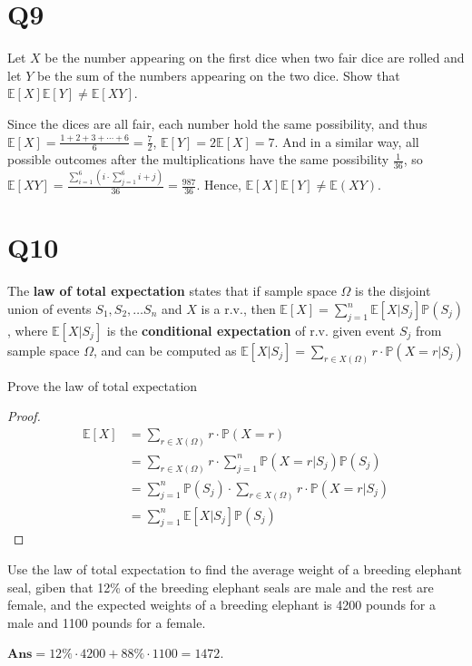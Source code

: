 \documentclass[11pt]{article}
\begin{document}
\section*{Q9}
Let $X$ be the number appearing on the first dice when two fair dice 
are rolled and let $Y$ be the sum of the numbers appearing on 
the two dice. Show that $\mathbb{E}[X]\mathbb{E}[Y]\neq \mathbb{E}[XY]$.
\begin{solution}
    Since the dices are all fair, each number hold the same possibility, and 
    thus $\mathbb{E}[X]=\frac{1+2+3+ \cdots +6}{6}=\frac{7}{2}$, $\mathbb{E}[Y]=2\mathbb{E}[X]=7$.
    And in a similar way, all possible outcomes after the multiplications have the same possibility $\frac{1}{36}$, 
    so $\mathbb{E}[XY]=\frac{\sum_{i=1}^{6}\left( i\cdot \sum_{j=1}^{6}i+j \right)}{36}=\frac{987}{36}$. Hence, $\mathbb{E}[X]\mathbb{E}[Y]\neq \mathbb{E}(XY)$.
\end{solution}

\section*{Q10}
The \textbf{law of total expectation} states that if sample space 
$\Omega$ is the disjoint union of events $S_1,S_2, \ldots S_{n}$ 
and $X$ is a r.v., then $\mathbb{E}[X]=\sum_{j=1}^{n}\mathbb{E}[X \vert S_{j}]\mathbb{P}(S_{j})$,
where $\mathbb{E}[X \vert S_{j}]$ is the \textbf{conditional expectation} of 
r.v. given event $S_{j} $ from sample space $\Omega$, and can be computed
as $\mathbb{E}[X \vert S_{j}]=\sum_{r \in X(\Omega)}r\cdot \mathbb{P}(X=r \vert S_{j})$
\begin{qparts}
    
    \item Prove the law of total expectation
    \begin{proof}
        \begin{align*}
            \mathbb{E}[X]&=\sum_{r \in X(\Omega)}r\cdot \mathbb{P}(X=r)\\
            &=\sum_{r \in X(\Omega)}r\cdot \sum_{j=1}^{n}\mathbb{P}(X=r\vert S_{j})\mathbb{P}(S_{j})\\
            &=\sum_{j=1}^{n}\mathbb{P}(S_{j})\cdot \sum_{r \in X(\Omega)}r\cdot \mathbb{P}(X=r\vert S_{j})\\
            &=\sum_{j=1}^{n}\mathbb{E}[X\vert S_{j}]\mathbb{P}(S_{j})
        \end{align*}
    \end{proof}


    \item Use the law of total expectation to find the average weight
    of a breeding elephant seal, giben that 12\% of the breeding elephant
    seals are male and the rest are female, and the expected weights of
    a breeding elephant is 4200 pounds for a male and 1100 pounds for a
    female.
    \begin{solution}
        $\textbf{Ans}=12\%\cdot 4200+88\%\cdot 1100=1472$.
    \end{solution}
\end{qparts}
\end{document}

